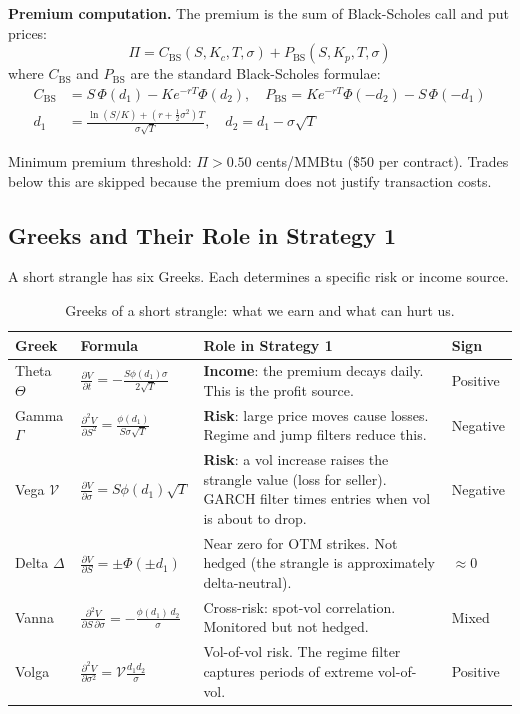\documentclass[11pt,a4paper]{article}
\begin{document}
\textbf{Premium computation.} The premium is the sum of Black-Scholes call and put prices:
\begin{equation}
\Pi = C_{\text{BS}}(S, K_c, T, \sigma) + P_{\text{BS}}(S, K_p, T, \sigma)
\label{eq:premium}
\end{equation}
where $C_{\text{BS}}$ and $P_{\text{BS}}$ are the standard Black-Scholes formulae:
\begin{align}
C_{\text{BS}} &= S\,\Phi(d_1) - K e^{-rT}\Phi(d_2), \quad
P_{\text{BS}} = K e^{-rT}\Phi(-d_2) - S\,\Phi(-d_1) \label{eq:bs} \\
d_1 &= \frac{\ln(S/K) + (r + \tfrac{1}{2}\sigma^2)T}{\sigma\sqrt{T}}, \quad
d_2 = d_1 - \sigma\sqrt{T} \nonumber
\end{align}

Minimum premium threshold: $\Pi > 0.50$ cents/MMBtu (\$50 per contract). Trades below this are skipped because the premium does not justify transaction costs.

\subsection{Greeks and Their Role in Strategy 1}

A short strangle has six Greeks. Each determines a specific risk or income source.

\begin{table}[H]
\centering
\caption{Greeks of a short strangle: what we earn and what can hurt us.}
\label{tab:greeks}
\begin{tabularx}{\textwidth}{llXl}
\toprule
Greek & Formula & Role in Strategy 1 & Sign \\
\midrule
Theta $\Theta$ & $\frac{\partial V}{\partial t} = -\frac{S\phi(d_1)\sigma}{2\sqrt{T}}$ & \textbf{Income}: the premium decays daily. This is the profit source. & Positive \\
Gamma $\Gamma$ & $\frac{\partial^2 V}{\partial S^2} = \frac{\phi(d_1)}{S\sigma\sqrt{T}}$ & \textbf{Risk}: large price moves cause losses. Regime and jump filters reduce this. & Negative \\
Vega $\mathcal{V}$ & $\frac{\partial V}{\partial \sigma} = S\phi(d_1)\sqrt{T}$ & \textbf{Risk}: a vol increase raises the strangle value (loss for seller). GARCH filter times entries when vol is about to drop. & Negative \\
Delta $\Delta$ & $\frac{\partial V}{\partial S} = \pm\Phi(\pm d_1)$ & Near zero for OTM strikes. Not hedged (the strangle is approximately delta-neutral). & $\approx 0$ \\
Vanna & $\frac{\partial^2 V}{\partial S\,\partial \sigma} = -\frac{\phi(d_1)\,d_2}{\sigma}$ & Cross-risk: spot-vol correlation. Monitored but not hedged. & Mixed \\
Volga & $\frac{\partial^2 V}{\partial \sigma^2} = \mathcal{V}\frac{d_1 d_2}{\sigma}$ & Vol-of-vol risk. The regime filter captures periods of extreme vol-of-vol. & Positive \\
\bottomrule
\end{tabularx}
\end{table}
\end{document}
